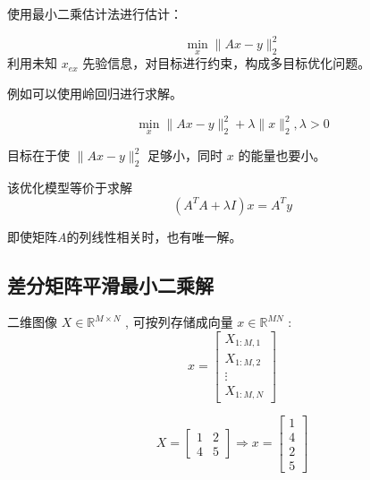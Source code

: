 使用最小二乘估计法进行估计：

\begin{problem}[最小二乘法进行估计]
    \begin{equation}
\min _{x}\|A x-y\|_{2}^{2}
\end{equation}
利用未知 $ x_{e x} $ 先验信息，对目标进行约束，构成多目标优化问题。 
\end{problem}


例如可以使用岭回归进行求解。


\begin{definition}
    \begin{equation}
\min _{x}\|A x-y\|_{2}^{2}+\lambda\|x\|_{2}^{2}, \lambda>0
\end{equation}
\end{definition}

目标在于使 $ \|A x-y\|_{2}^{2} $ 足够小，同时 $ x $ 的能量也要小。

\begin{theorem}[岭回归问题的标准方程]
    该优化模型等价于求解
\begin{equation}
\left(A^{T} A+\lambda I\right) x=A^{T} y
\end{equation}
\end{theorem}

即使矩阵$A$的列线性相关时，也有唯一解。

\subsection{差分矩阵平滑最小二乘解}

\begin{definition}[图像转换为列向量存储]
    二维图像 $ X \in \mathbb{R}^{M \times N} $ , 可按列存储成向量 $ x \in \mathbb{R}^{M N} $ :
    \begin{equation}
    x=\left[\begin{array}{c}
    X_{1: M, 1} \\
    X_{1: M, 2} \\
    \vdots \\
    X_{1: M, N}
    \end{array}\right] \end{equation} 
\end{definition}


\begin{example}
    \begin{equation} 
X=\left[\begin{array}{ll}
1 & 2 \\
4 & 5
\end{array}\right] \Rightarrow x=\left[\begin{array}{l}
1 \\
4 \\
2 \\
5
\end{array}\right]
\end{equation}
\end{example}

